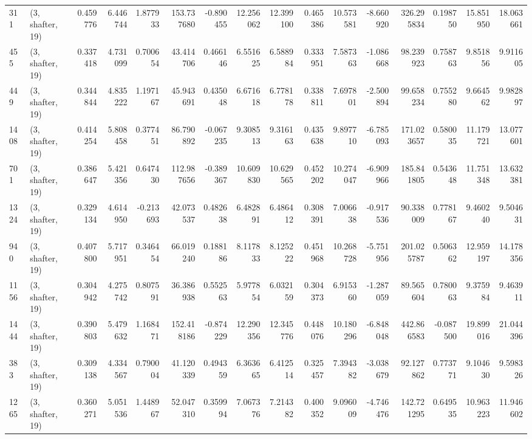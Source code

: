 \begin{tabular}{llrrrrrrrrrrrrrr}
311  &  (3, shafter, 19) &   0.459776 &   6.446744 &   1.877933 &    153.737680 &   -0.890455 &   12.256062 &   12.399100 &  0.465386 &  10.573581 &  -8.660920 &   326.295834 &   0.198750 &  15.851950 &  18.063661 \\
455  &  (3, shafter, 19) &   0.337418 &   4.731099 &   0.700654 &     43.414706 &    0.466146 &    6.551625 &    6.588984 &  0.333951 &   7.587363 &  -1.086668 &    98.239923 &   0.758763 &   9.851856 &   9.911605 \\
449  &  (3, shafter, 19) &   0.344844 &   4.835222 &   1.197167 &     45.943691 &    0.435048 &    6.671618 &    6.778178 &  0.338811 &   7.697801 &  -2.500894 &    99.658234 &   0.755280 &   9.664562 &   9.982897 \\
1408 &  (3, shafter, 19) &   0.414254 &   5.808458 &   0.377451 &     86.790892 &   -0.067235 &    9.308513 &    9.316163 &  0.435638 &   9.897710 &  -6.785093 &   171.023657 &   0.580035 &  11.179721 &  13.077601 \\
701  &  (3, shafter, 19) &   0.386647 &   5.421356 &   0.647430 &    112.987656 &   -0.389367 &   10.609830 &   10.629565 &  0.452202 &  10.274047 &  -6.909966 &   185.841805 &   0.543648 &  11.751348 &  13.632381 \\
1324 &  (3, shafter, 19) &   0.329134 &   4.614950 &  -0.213693 &     42.073537 &    0.482638 &    6.482891 &    6.486412 &  0.308391 &   7.006638 &  -0.917536 &    90.338009 &   0.778167 &   9.460240 &   9.504631 \\
940  &  (3, shafter, 19) &   0.407800 &   5.717951 &   0.346454 &     66.019240 &    0.188186 &    8.117833 &    8.125222 &  0.451968 &  10.268728 &  -5.751956 &   201.025787 &   0.506362 &  12.959197 &  14.178356 \\
1156 &  (3, shafter, 19) &   0.304942 &   4.275742 &   0.807591 &     36.386938 &    0.552563 &    5.977854 &    6.032159 &  0.304373 &   6.915360 &  -1.287059 &    89.565604 &   0.780063 &   9.375984 &   9.463911 \\
1444 &  (3, shafter, 19) &   0.390803 &   5.479632 &   1.168471 &    152.418186 &   -0.874229 &   12.290356 &   12.345776 &  0.448076 &  10.180296 &  -6.848048 &   442.866583 &  -0.087500 &  19.899016 &  21.044396 \\
383  &  (3, shafter, 19) &   0.309138 &   4.334567 &   0.790004 &     41.120339 &    0.494359 &    6.363665 &    6.412514 &  0.325457 &   7.394382 &  -3.038679 &    92.127862 &   0.773771 &   9.104630 &   9.598326 \\
1265 &  (3, shafter, 19) &   0.360271 &   5.051536 &   1.448967 &     52.047310 &    0.359994 &    7.067376 &    7.214382 &  0.400352 &   9.096009 &  -4.746476 &   142.721295 &   0.649535 &  10.963223 &  11.946602 \\

\end{tabular}
